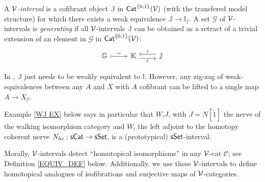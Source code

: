 \documentclass[a4paper,10pt
,draft
]{article}%
\newcommand{\I}{\mathbb I}
\newcommand{\J}{\mathbb J}
\renewcommand{\1}{\eta}%
\begin{document}
\begin{definition}
      A {\em $\mathcal V$-interval} is a cofibrant object $\J$ in $\mathsf{Cat}^{\left\{0,1\right\}}(\mathcal V)$ (with the transfered model structure)
      for which there exists a weak equivalence $\J \to \I_f$.
      A set $\mathcal{G}$ of $\mathcal V$-intervals is {\em generating} if all $\mathcal V$-intervals $\J$ can be obtained
      as a retract of a trivial extension of an element in $\mathcal{G}$ in $\mathsf{Cat}^{\left\{0,1\right\}}(\mathcal V)$:
      \begin{equation}
            \begin{tikzcd}
                  \mathbb{G} \arrow[r,rightarrowtail, "\sim"]
                  &
                  \mathbb{K} \arrow[r,yshift=-.3em, "r"']
                  &
                  \mathbb{J} \arrow[l,yshift=.3em, "i"']
            \end{tikzcd}
      \end{equation}
\end{definition}

\begin{remark}
      In \cite{BM13}, $\J$ just needs to be weakly equivalent to $\I$.
      However, any zig-zag of weak-equivalences between any $A$ and $X$ with $A$ cofibrant
      can be lifted to a single map $A \to X_f$.
\end{remark}

Example \ref{WJ EX} below says in particular that $W_!J$,
with $J = N[\tilde 1]$ the nerve of the walking isomorphism category and
$W_!$ the left adjoint to the homotopy coherent nerve $N_{hc}: \mathsf{sCat} \to \mathsf{sSet}$,
is a (prototypical) $\mathsf{sSet}$-interval.


Morally, $\mathcal V$-intervals detect ``homotopical isomorphisms'' in any $\mathcal V$-cat $\mathcal C$; see Definition \ref{EQUIV_DEF} below.
Additionally, we use these $\mathcal V$-intervals to define homotopical analogues of isofibrations and surjective maps of $\mathcal V$-categories.
\end{document}
